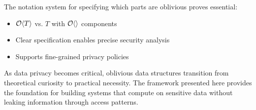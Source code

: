 \documentclass[11pt,final,hidelinks]{article}
\begin{document}
The notation system for specifying which parts are oblivious proves essential:
\begin{itemize}
    \item $\mathcal{O}\langle T \rangle$ vs. $T$ with $\mathcal{O}\langle  \rangle$ components
    \item Clear specification enables precise security analysis
    \item Supports fine-grained privacy policies
\end{itemize}

As data privacy becomes critical, oblivious data structures transition from theoretical curiosity to practical necessity. The framework presented here provides the foundation for building systems that compute on sensitive data without leaking information through access patterns.


\end{document}
